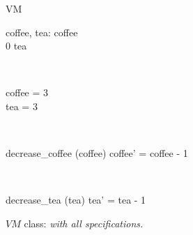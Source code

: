 \begin{figure}[H]
\centering
\begin{class}{VM}
\\
\begin{state}
coffee, tea: \integer
{} \leq  coffee 
\\
0 \leq  tea 
\end{state} 
\\
\begin{init}
coffee = 3
\\tea = 3
\end{init} 
\\
\begin{op}{decrease\_coffee}
\Delta (coffee)
\ST
coffee' = coffee - 1
\end{op}
\\
\begin{op}{decrease\_tea}
\Delta (tea)
\ST
tea' = tea - 1
\end{op}
\end{class}
\caption{$VM$ class: \textit{with all specifications.}}
\label{oz_vm_with_all_specifications}
\end{figure}